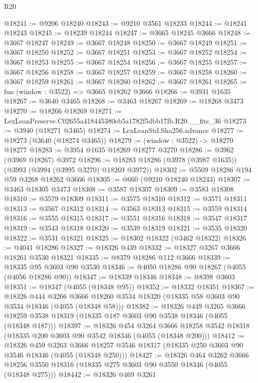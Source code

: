 \begin{lexlean}{R20}
\begin{coremodule}
@18241 := @9206 @18240
@18243 := @9210 @3561 @18233
@18244 := @18241 @18243
@18245 := @18239 @18244
@18247 := @3665 @18245 @3666
@18248 := @3667 @18247
@18249 := @3667 @18248
@18250 := @3667 @18249
@18251 := @3667 @18250
@18252 := @3667 @18251
@18253 := @3667 @18252
@18254 := @3667 @18253
@18255 := @3667 @18254
@18256 := @3667 @18255
@18257 := @3667 @18256
@18258 := @3667 @18257
@18259 := @3667 @18258
@18260 := @3667 @18259
@18261 := @3667 @18260
@18262 := @3667 @18261
@18265 := fun (window : @3522) => @3665 @18262 @3666
@18266 := @3931 @1635
@18267 := @3640 @3465
@18268 := @3463 @18267
@18269 := @18268 @3473
@18270 := @18266 @18269
@18271 := LexLeanPreserve.C02655a418445380eb5a1782f5dbb17fb.R20.__fits_36
@18273 := @3940 (@18271 @3465)
@18274 := LexLeanStd.Sha256.advance
@18277 := @18273 (@3640 (@18274 @3465))
@18279 := (window : @3522) -> @18270 @18277
@18283 := @3954 @1635 @18269 @18277 @3270
@18286 := @3962 (@3969 @18267) @3972
@18296 := @18283 @18286 (@3978 (@3987 @1635)) (@3993 (@3994 (@3995 @3270) @18269 @3972))
@18302 := @5509 @18286 @194 @59 @3268 @18262 @3666
@18305 := @660 (@9210 @18240 @18243)
@18307 := @3463 @18305 @3473
@18308 := @3587 @18307
@18309 := @3583 @18308
@18310 := @3579 @18309
@18311 := @3575 @18310
@18312 := @3571 @18311
@18313 := @3567 @18312
@18314 := @3563 @18313
@18315 := @3559 @18314
@18316 := @3555 @18315
@18317 := @3551 @18316
@18318 := @3547 @18317
@18319 := @3543 @18318
@18320 := @3539 @18319
@18321 := @3535 @18320
@18322 := @3531 @18321
@18325 := @18302 @18322 (@3462 @18322)
@18326 := @4041 @18286
@18327 := @18326 @439
@18332 := @18327 @3267 @3666 @18261 @3530 @18321
@18335 := @8379 @18286 @112 @3666
@18339 := @18335 @95 @3603 @90 @3530
@18346 := @4050 @18286 @90 @18267 (@4055 (@4056 @18286 @90))
@18347 := @18339 @18346
@18348 := @8398 @3603
@18351 := @18347 (@4055 (@18348 @95))
@18352 := @18332 @18351
@18367 := @18326
    @444
    @3266
    @3666
    @18260
    @3534
    @18320
    (@18335 @58 @3603 @90 @3534 @18346 (@4055 (@18348 @58)))
@18382 := @18326
    @449
    @3265
    @3666
    @18259
    @3538
    @18319
    (@18335 @187 @3603 @90 @3538 @18346 (@4055 (@18348 @187)))
@18397 := @18326
    @454
    @3264
    @3666
    @18258
    @3542
    @18318
    (@18335 @200 @3603 @90 @3542 @18346 (@4055 (@18348 @200)))
@18412 := @18326
    @459
    @3263
    @3666
    @18257
    @3546
    @18317
    (@18335 @250 @3603 @90 @3546 @18346 (@4055 (@18348 @250)))
@18427 := @18326
    @464
    @3262
    @3666
    @18256
    @3550
    @18316
    (@18335 @275 @3603 @90 @3550 @18346 (@4055 (@18348 @275)))
@18442 := @18326
    @469
    @3261

\end{coremodule}
\end{lexlean}
